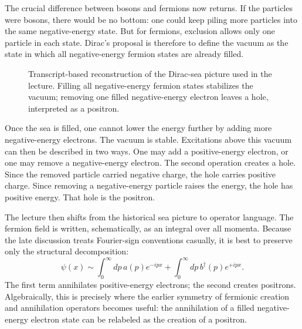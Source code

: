 The crucial difference between bosons and fermions now returns. If the particles were bosons, there would be no bottom: one could keep piling more particles into the same negative-energy state. But for fermions, exclusion allows only one particle in each state. Dirac's proposal is therefore to define the vacuum as the state in which all negative-energy fermion states are already filled.

\begin{figure}[ht]
\centering
{}
\caption{Transcript-based reconstruction of the Dirac-sea picture used in the lecture. Filling all negative-energy fermion states stabilizes the vacuum; removing one filled negative-energy electron leaves a hole, interpreted as a positron.}
\label{fig:aqm10-dirac-sea}
\end{figure}

Once the sea is filled, one cannot lower the energy further by adding more negative-energy electrons. The vacuum is stable. Excitations above this vacuum can then be described in two ways. One may add a positive-energy electron, or one may remove a negative-energy electron. The second operation creates a hole. Since the removed particle carried negative charge, the hole carries positive charge. Since removing a negative-energy particle raises the energy, the hole has positive energy. That hole is the positron.

The lecture then shifts from the historical sea picture to operator language. The fermion field is written, schematically, as an integral over all momenta. Because the late discussion treats Fourier-sign conventions casually, it is best to preserve only the structural decomposition:
\begin{equation}
\psi(x)\sim
\int_0^\infty dp\, a(p)e^{-ipx}
+
\int_0^\infty dp\, b^\dagger(p)e^{+ipx}.
\end{equation}
The first term annihilates positive-energy electrons; the second creates positrons. Algebraically, this is precisely where the earlier symmetry of fermionic creation and annihilation operators becomes useful: the annihilation of a filled negative-energy electron state can be relabeled as the creation of a positron.

